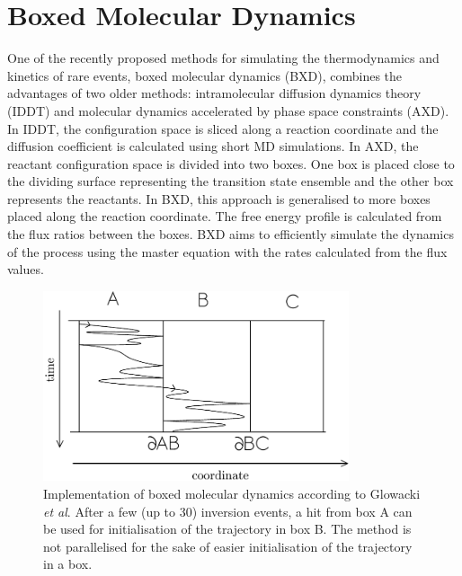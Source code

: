 \section{Boxed Molecular Dynamics}

One of the recently proposed methods for simulating the thermodynamics and kinetics of rare events, boxed molecular dynamics \cite{Glowacki2009} (BXD), combines the advantages of two older methods: intramolecular diffusion dynamics theory\cite{Guo1999,Shalashilin1997} (IDDT) and molecular dynamics accelerated by phase space constraints\cite{Martinez-Nunez2006} (AXD).
In IDDT, the configuration space is sliced along a reaction coordinate and the diffusion coefficient is calculated using short MD simulations.
In AXD, the reactant configuration space is divided into two boxes. 
One box is placed close to the dividing surface representing the transition state ensemble and the other box represents the reactants.
In BXD, this approach is generalised to more boxes placed along the reaction coordinate.
The free energy profile is calculated from the flux ratios between the boxes.
BXD aims to efficiently simulate the dynamics of the process using the master equation with the rates calculated from the flux values.

\begin{figure}[h]
\label{fig:bxd-implement}
\centering
\includegraphics[width=9cm]{Images/bxdimplement.pdf}
\caption[Implementation of boxed molecular dynamics.]{Implementation of boxed molecular dynamics according to Glowacki {\it et al}.\cite{Glowacki2009} After a few (up to 30) inversion events, a hit from box A can be used for initialisation of the trajectory in box B. The method is not parallelised for the sake of easier initialisation of the trajectory in a box. }
\end{figure}

